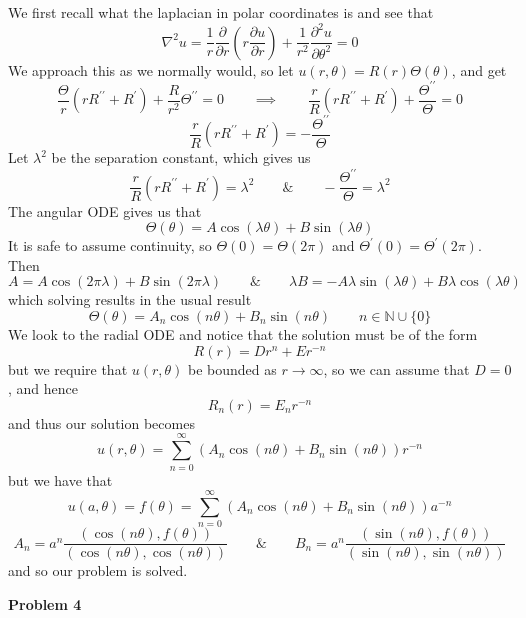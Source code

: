 \documentclass[10pt]{article}
\begin{document}
We first recall what the laplacian in polar coordinates is and see that
$$\nabla^{2}u = \frac{1}{r}\frac{\partial}{\partial r}\left(r\frac{\partial u}{\partial r}\right) + \frac{1}{r^{2}}\frac{\partial^{2}u}{\partial \theta^{2}} = 0$$
We approach this as we normally would, so let $u(r,\theta) = R(r)\Theta(\theta)$, and get
$$\frac{\Theta}{r}\left(rR^{\prime\prime} + R^{\prime}\right) + \frac{R}{r^{2}}\Theta^{\prime\prime} = 0 \hspace{2em} \implies \hspace{2em}\frac{r}{R}(rR^{\prime\prime} + R^{\prime})+ \frac{\Theta^{\prime\prime}}{\Theta} = 0$$
$$\frac{r}{R}(rR^{\prime\prime} + R^{\prime})=-\frac{\Theta^{\prime\prime}}{\Theta}$$
Let $\lambda^{2}$ be the separation constant, which gives us
$$\frac{r}{R}(rR^{\prime\prime} + R^{\prime}) = \lambda^{2} \hspace{2em} \& \hspace{2em} -\frac{\Theta^{\prime\prime}}{\Theta}=\lambda^{2}$$
The angular ODE gives us that
$$\Theta(\theta) = A\cos(\lambda \theta) + B\sin(\lambda \theta)$$
It is safe to assume continuity, so $\Theta(0) = \Theta(2\pi)$ and $\Theta^{\prime}(0) = \Theta^{\prime}(2\pi)$.  Then
$$A = A\cos(2\pi \lambda) + B\sin(2\pi \lambda) \hspace{2em} \& \hspace{2em} \lambda B = -A\lambda\sin(\lambda \theta)+B\lambda\cos(\lambda \theta)$$
which solving results in the usual result
$$\Theta(\theta) = A_{n}\cos(n\theta) + B_{n}\sin(n\theta) \hspace{2em} n\in\mathbb{N}\cup \{0\}$$
We look to the radial ODE and notice that the solution must be of the form
$$R(r) = Dr^{n} + Er^{-n}$$
but we require that $u(r,\theta)$ be bounded as $r \to \infty$, so we can assume that $D = 0$, and hence
$$R_{n}(r) = E_{n}r^{-n}$$
and thus our solution becomes
$$u(r,\theta) = \sum_{n=0}^{\infty}\left(A_{n}\cos(n\theta) + B_{n}\sin(n\theta)\right)r^{-n}$$
but we have that
$$u(a,\theta) = f(\theta) = \sum_{n=0}^{\infty}\left(A_{n}\cos(n\theta) + B_{n}\sin(n\theta)\right)a^{-n} $$
$$A_{n} = a^{n}\frac{(\cos(n\theta),f(\theta))}{(\cos(n\theta),\cos(n\theta))} \hspace{2em} \& \hspace{2em} B_{n} =  a^{n}\frac{(\sin(n\theta),f(\theta))}{(\sin(n\theta),\sin(n\theta))}$$
and so our problem is solved.

\newpage
\textbf{Problem 4}
\end{document}
